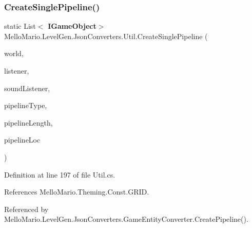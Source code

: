 \subsubsection{Create\+Single\+Pipeline()}
{\footnotesize\ttfamily static List$<$\textbf{ I\+Game\+Object}$>$ Mello\+Mario.\+Level\+Gen.\+Json\+Converters.\+Util.\+Create\+Single\+Pipeline (\begin{DoxyParamCaption}\item[{\textbf{ I\+World}}]{world,  }\item[{\textbf{ I\+Listener}$<$ \textbf{ I\+Game\+Object} $>$}]{listener,  }\item[{\textbf{ I\+Listener}$<$ \textbf{ I\+Soundable} $>$}]{sound\+Listener,  }\item[{string}]{pipeline\+Type,  }\item[{int}]{pipeline\+Length,  }\item[{Point}]{pipeline\+Loc }\end{DoxyParamCaption})\hspace{0.3cm}{\ttfamily [static]}}



Definition at line 197 of file Util.\+cs.



References Mello\+Mario.\+Theming.\+Const.\+G\+R\+ID.



Referenced by Mello\+Mario.\+Level\+Gen.\+Json\+Converters.\+Game\+Entity\+Converter.\+Create\+Pipeline().


